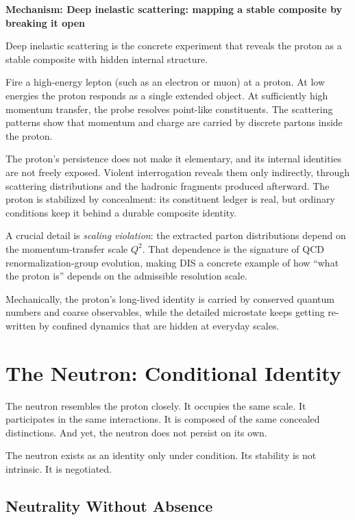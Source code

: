 \documentclass[11pt,twoside,openright]{book}
\newenvironment{mechanismbox}[1]
  {\begin{framed}\noindent\textbf{Mechanism: #1}\par\medskip}
  {\end{framed}}
\begin{document}
\begin{mechanismbox}{Deep inelastic scattering: mapping a stable composite by breaking it open}
Deep inelastic scattering is the concrete experiment that reveals the proton as a stable composite with hidden internal structure.

Fire a high-energy lepton (such as an electron or muon) at a proton. At low energies the proton responds as a single extended object. At sufficiently high momentum transfer, the probe resolves point-like constituents. The scattering patterns show that momentum and charge are carried by discrete partons inside the proton.

The proton's persistence does not make it elementary, and its internal identities are not freely exposed. Violent interrogation reveals them only indirectly, through scattering distributions and the hadronic fragments produced afterward. The proton is stabilized by concealment: its constituent ledger is real, but ordinary conditions keep it behind a durable composite identity.

A crucial detail is \emph{scaling violation}: the extracted parton distributions depend on the momentum-transfer scale $Q^2$. That dependence is the signature of QCD renormalization-group evolution, making DIS a concrete example of how ``what the proton is'' depends on the admissible resolution scale.

Mechanically, the proton's long-lived identity is carried by conserved quantum numbers and coarse observables, while the detailed microstate keeps getting re-written by confined dynamics that are hidden at everyday scales.
\end{mechanismbox}
\chapter{The Neutron: Conditional Identity}

The neutron resembles the proton closely. It occupies the same scale. It participates in the same interactions. It is composed of the same concealed distinctions. And yet, the neutron does not persist on its own.

The neutron exists as an identity only under condition. Its stability is not intrinsic. It is negotiated.

\section*{Neutrality Without Absence}
\end{document}

